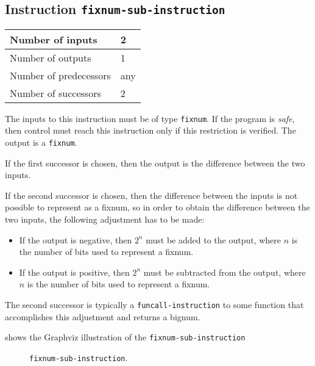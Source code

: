 \subsection{Instruction \texttt{fixnum-sub-instruction}}
\label{mir-instruction-fixnum-sub}

\begin{tabular}{|l|l|}
\hline
Number of inputs & 2\\
\hline
Number of outputs & 1\\
\hline
Number of predecessors & any\\
\hline
Number of successors & 2\\
\hline
\end{tabular}

The inputs to this instruction must be of type \texttt{fixnum}.  If
the program is \emph{safe}, then control must reach this instruction
only if this restriction is verified.  The output is a
\texttt{fixnum}.

If the first successor is chosen, then the output is the difference
between the two inputs.

If the second successor is chosen, then the difference between the
inputs is not possible to represent as a fixnum, so in order to obtain
the difference between the two inputs, the following adjustment has to
be made:

\begin{itemize}
\item If the output is negative, then $2^n$ must be added to the
  output, where $n$ is the number of bits used to represent a fixnum. 
\item If the output is positive, then $2^n$ must be subtracted from
  the output, where $n$ is the number of bits used to represent a
  fixnum.
\end{itemize}

The second successor is typically a \texttt{funcall-instruction} to
some function that accomplishes this adjustment and returns a bignum.

 shows the Graphviz illustration of the
\texttt{fixnum-sub-instruction}

\begin{figure}
\begin{center}
\end{center}
\caption{\label{fig-fixnum-sub-instruction}
\texttt{fixnum-sub-instruction}.}
\end{figure}

